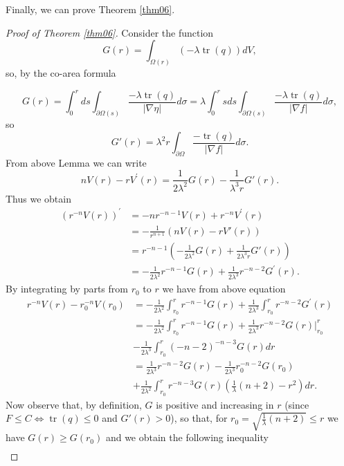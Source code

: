\documentclass{amsart}
\theoremstyle{plain}
\numberwithin{equation}{section}
\begin{document}
Finally, we can prove Theorem \ref{thm06}.
\begin{proof}[Proof of Theorem \ref{thm06}]
    Consider the function
    $$G(r)=\int_{\Omega(r)}(-\lambda\operatorname{tr}(q))dV,$$
so, by the co-area formula

\begin{equation*}
     G(r)=\int_{0}^{r}ds\int_{\partial \Omega(s)}\frac{-\lambda\operatorname{tr}(q)}{|\nabla \eta|}d\sigma=\lambda\int_{0}^{r}sds\int_{\partial \Omega(s)}\frac{-\lambda\operatorname{tr}(q)}{|\nabla f|}d\sigma,
 \end{equation*}
 so
$$G'(r)=\lambda^2r\int_{\partial\Omega}\frac{-\operatorname{tr}(q)}{|\nabla f|}d\sigma.$$
From above Lemma we can write
\begin{equation}
nV(r)-rV^{\prime}(r)=\frac{1}{2\lambda^2}G(r) - \frac{1}{\lambda^3r}G'(r).
\end{equation}
Thus we obtain
\begin{align*}
     \left(r^{-n}V(r)\right)^{\prime}&= -nr^{-n-1}V(r)+r^{-n}V^{\prime}(r) \\
     &= -\frac{1}{r^{n+1}}(nV(r)-rV'(r))\\
     &= r^{-n-1}\left(-\frac{1}{2\lambda^2}G(r) + \frac{1}{2\lambda^3r}G'(r)\right) \\
     &= -\frac{1}{2\lambda^2}r^{-n-1}G(r) + \frac{1}{2\lambda^3}r^{-n-2}G^{\prime}(r).
 \end{align*}
 By integrating by parts from $r_0$ to $r$ we have from above equation
 \begin{align*}
    r^{-n}V(r)-r_{0}^{-n}V(r_0) &= -\frac{1}{2\lambda^2}\int_{r_0}^{r} r^{-n-1}G(r) + \frac{1}{2\lambda^3}\int_{r_0}^{r} r^{-n-2}G^{\prime}(r)\\
    &= -\frac{1}{2\lambda^2}\int_{r_0}^{r} r^{-n-1}G(r) +\frac{1}{2\lambda^3}r^{-n-2}G(r)\big|_{r_0}^r\\ & - \frac{1}{2\lambda^3}\int_{r_0}^r(-n-2)^{-n-3}G(r)dr \\
    &= \frac{1}{2\lambda^3}r^{-n-2}G(r)-\frac{1}{2\lambda^3}r_{0}^{-n-2}G(r_0) \\ & + \frac{1}{2\lambda^2}\int_{r_0}^{r}r^{-n-3}G(r)\left(\frac{1}{\lambda}(n+2)-r^2\right)dr.
\end{align*}
Now observe that, by definition,  $G$ is positive and increasing in $r$ (since $F\leq C\Leftrightarrow\operatorname{tr}(q)\leq 0$ and $G'(r)>0$), so that, for $r_0=\sqrt{\frac{1}{\lambda}(n+2)}\leq r$ we have $G(r)\geq G(r_0)$ and we obtain the following inequality
\begin{align*}

\end{align*}
\end{proof}
\end{document}
